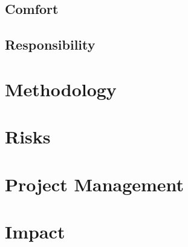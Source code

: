 \subsection{Comfort}


\subsection{Responsibility}


\section{Methodology}
\label{sec:methodology}








\section{Risks}
\label{sec:risks}


% 


\section{Project Management}
\label{sec:project_management}


\section{Impact}
\label{sec:proposed_approach}


